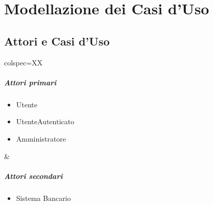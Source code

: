 \chapter{Modellazione dei Casi d'Uso}
\section{Attori e Casi d'Uso}
\begin{table}[!hbp]
	\centering
	\begin{tblr}{colspec=XX}
		\begin{minipage}[t]{\linewidth}
			\paragraph{Attori primari}
			\begin{itemize}
				\item Utente
				\item UtenteAutenticato
				\item Amministratore
			\end{itemize}
		\end{minipage} &
		\begin{minipage}[t]{\linewidth}
			\paragraph{Attori secondari}
			\begin{itemize}
				\item Sistema Bancario
			\end{itemize}
		\end{minipage} \\
	\end{tblr}
\end{table}
